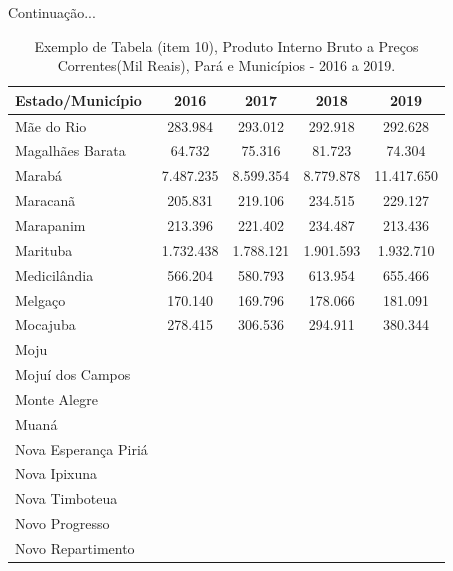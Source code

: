 \newpage
\begin{table}[!htb]
    \centering
    {
    \caption{Exemplo de Tabela (item 10), Produto Interno Bruto a Preços Correntes(Mil Reais), Pará e Municípios - 2016 a 2019.}  Continuação...
    \label{item 10 regras3}
    \vspace{0.1cm}
\begin{tabular}{l|c|c|c|c}
  \hline\hline
  Estado/Município        &    2016    &    2017    &  2018      &  2019    \\
  \hline\hline
   Mãe do Rio             &  283.984   &  293.012   &  292.918   & 292.628   \\
   Magalhães Barata       &  64.732    &  75.316    &  81.723    & 74.304    \\
   Marabá                 &  7.487.235 &  8.599.354 &  8.779.878 & 11.417.650 \\
   Maracanã               & 205.831    &  219.106   &  234.515   & 229.127    \\ 
   Marapanim              & 213.396    &  221.402   &  234.487   & 213.436    \\
   Marituba               & 1.732.438  & 1.788.121  &  1.901.593 &  1.932.710  \\
   Medicilândia           & 566.204    & 580.793    &  613.954   &  655.466    \\
   Melgaço                & 170.140    & 169.796    &  178.066   &  181.091     \\
   Mocajuba               & 278.415    & 306.536    &  294.911   &   380.344     \\
   Moju                   &             &             &             &               \\
   Mojuí dos Campos       &             &             &             &               \\
   Monte Alegre           &             &             &             &               \\
   Muaná                  &             &             &             &    \\
   Nova Esperança Piriá   &             &             &             &    \\
   Nova Ipixuna           &             &             &             &    \\
   Nova Timboteua         &             &             &             &   \\
   Novo Progresso         &             &             &             &    \\
   Novo Repartimento      &             &             &             &    \\

\end{tabular}}
\end{table}
